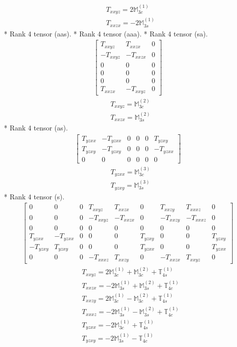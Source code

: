 \documentclass[fleqn,8pt,landscape]{jsarticle}
\begin{document}
\begin{align*}
& T_{xxyz} = 2 \mathbb{M}_{3c}^{(1)} \\
& T_{xxzx} = - 2 \mathbb{M}_{3s}^{(1)}
\end{align*}
* Rank 4 tensor (aas).
* Rank 4 tensor (aaa).
* Rank 4 tensor (sa).
\begin{align*}
\begin{bmatrix} T_{xxyz} & T_{xxzx} & 0 \\ - T_{xxyz} & - T_{xxzx} & 0 \\ 0 & 0 & 0 \\ 0 & 0 & 0 \\ 0 & 0 & 0 \\ T_{xxzx} & - T_{xxyz} & 0 \end{bmatrix}
\end{align*}
\begin{align*}
& T_{xxyz} = \mathbb{M}_{3c}^{(2)} \\
& T_{xxzx} = \mathbb{M}_{3s}^{(2)}
\end{align*}
* Rank 4 tensor (as).
\begin{align*}
\begin{bmatrix} T_{yzxx} & - T_{yzxx} & 0 & 0 & 0 & T_{yzxy} \\ T_{yzxy} & - T_{yzxy} & 0 & 0 & 0 & - T_{yzxx} \\ 0 & 0 & 0 & 0 & 0 & 0 \end{bmatrix}
\end{align*}
\begin{align*}
& T_{yzxx} = \mathbb{M}_{3c}^{(3)} \\
& T_{yzxy} = \mathbb{M}_{3s}^{(3)}
\end{align*}
* Rank 4 tensor (s).
\begin{align*}
\begin{bmatrix} 0 & 0 & 0 & T_{xxyz} & T_{xxzx} & 0 & T_{xxzy} & T_{xxxz} & 0 \\ 0 & 0 & 0 & - T_{xxyz} & - T_{xxzx} & 0 & - T_{xxzy} & - T_{xxxz} & 0 \\ 0 & 0 & 0 & 0 & 0 & 0 & 0 & 0 & 0 \\ T_{yzxx} & - T_{yzxx} & 0 & 0 & 0 & T_{yzxy} & 0 & 0 & T_{yzxy} \\ - T_{yzxy} & T_{yzxy} & 0 & 0 & 0 & T_{yzxx} & 0 & 0 & T_{yzxx} \\ 0 & 0 & 0 & - T_{xxxz} & T_{xxzy} & 0 & - T_{xxzx} & T_{xxyz} & 0 \end{bmatrix}
\end{align*}
\begin{align*}
& T_{xxyz} = 2 \mathbb{M}_{3c}^{(1)} + \mathbb{M}_{3c}^{(2)} + \mathbb{T}_{4s}^{(1)} \\
& T_{xxzx} = - 2 \mathbb{M}_{3s}^{(1)} + \mathbb{M}_{3s}^{(2)} + \mathbb{T}_{4c}^{(1)} \\
& T_{xxzy} = 2 \mathbb{M}_{3c}^{(1)} - \mathbb{M}_{3c}^{(2)} + \mathbb{T}_{4s}^{(1)} \\
& T_{xxxz} = - 2 \mathbb{M}_{3s}^{(1)} - \mathbb{M}_{3s}^{(2)} + \mathbb{T}_{4c}^{(1)} \\
& T_{yzxx} = - 2 \mathbb{M}_{3c}^{(1)} + \mathbb{T}_{4s}^{(1)} \\
& T_{yzxy} = - 2 \mathbb{M}_{3s}^{(1)} - \mathbb{T}_{4c}^{(1)}
\end{align*}
\end{document}

